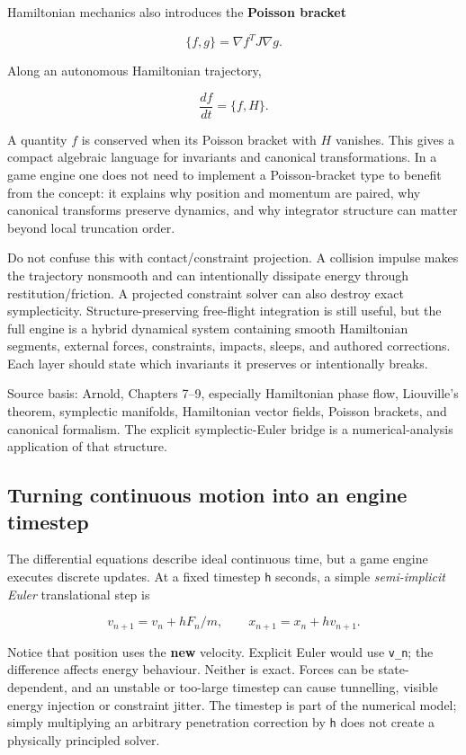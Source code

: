 Hamiltonian mechanics also introduces the \textbf{Poisson bracket}

\[
\{f,g\}
=
\nabla f^T J\nabla g.
\]

Along an autonomous Hamiltonian trajectory,

\[
\frac{df}{dt}
=
\{f,H\}.
\]

A quantity \(f\) is conserved when its Poisson bracket with \(H\) vanishes. This gives a compact algebraic language for invariants and canonical transformations. In a game engine one does not need to implement a Poisson-bracket type to benefit from the concept: it explains why position and momentum are paired, why canonical transforms preserve dynamics, and why integrator structure can matter beyond local truncation order.

Do not confuse this with contact/constraint projection. A collision impulse makes the trajectory nonsmooth and can intentionally dissipate energy through restitution/friction. A projected constraint solver can also destroy exact symplecticity. Structure-preserving free-flight integration is still useful, but the full engine is a hybrid dynamical system containing smooth Hamiltonian segments, external forces, constraints, impacts, sleeps, and authored corrections. Each layer should state which invariants it preserves or intentionally breaks.

Source basis: Arnold, Chapters 7--9, especially Hamiltonian phase flow, Liouville's theorem, symplectic manifolds, Hamiltonian vector fields, Poisson brackets, and canonical formalism. The explicit symplectic-Euler bridge is a numerical-analysis application of that structure.

\subsection{Turning continuous motion into an engine timestep}\label{02-foundations-ii-ch039-turning-continuous-motion-into-an-engine-timestep}

The differential equations describe ideal continuous time, but a game engine executes discrete updates. At a fixed timestep \texttt{h} seconds, a simple \emph{semi-implicit Euler} translational step is

\[
v_{n+1}=v_n+h F_n/m,\qquad x_{n+1}=x_n+h v_{n+1}.
\]

Notice that position uses the \textbf{new} velocity. Explicit Euler would use \texttt{v\_n}; the difference affects energy behaviour. Neither is exact. Forces can be state-dependent, and an unstable or too-large timestep can cause tunnelling, visible energy injection or constraint jitter. The timestep is part of the numerical model; simply multiplying an arbitrary penetration correction by \texttt{h} does not create a physically principled solver.

